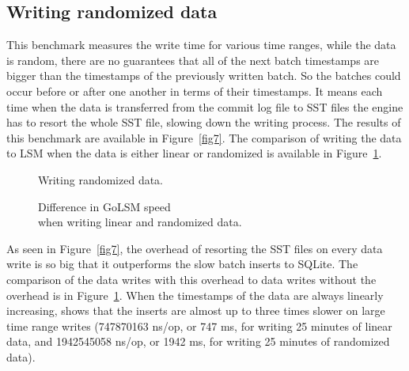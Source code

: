 \subsection{Writing randomized data}

This benchmark measures the write time for various time ranges, while the data is random, there are no guarantees that all of the next batch timestamps are bigger than the timestamps of the previously written batch. So the batches could occur before or after one another in terms of their timestamps. It means each time when the data is transferred from the commit log file to SST files the engine has to resort the whole SST file, slowing down the writing process. The results of this benchmark are available in Figure~\ref{fig7}. The comparison of writing the data to LSM when the data is either linear or randomized is available in Figure~\ref{fig8}.

\begin{figure}[!htb]
	\begin{minipage}{0.48\textwidth}
		\centering
		\resizebox{\textwidth}{!}{%
			
		}
		\caption{Writing randomized data.}\label{fig7}
	\end{minipage}\hfill
	\begin{minipage}{0.48\textwidth}
		\centering
		\resizebox{\textwidth}{!}{%
			
		}
		\caption{Difference in GoLSM speed \\ when writing linear and randomized data.}\label{fig8}
	\end{minipage}
\end{figure}

As seen in Figure~\ref{fig7}, the overhead of resorting the SST files on every data write is so big that it outperforms the slow batch inserts to SQLite. The comparison of the data writes with this overhead to data writes without the overhead is in Figure~\ref{fig8}. When the timestamps of the data are always linearly increasing, shows that the inserts are almost up to three times slower on large time range writes (747870163 ns/op, or 747 ms, for writing 25 minutes of linear data, and 1942545058 ns/op, or 1942 ms, for writing 25 minutes of randomized data).